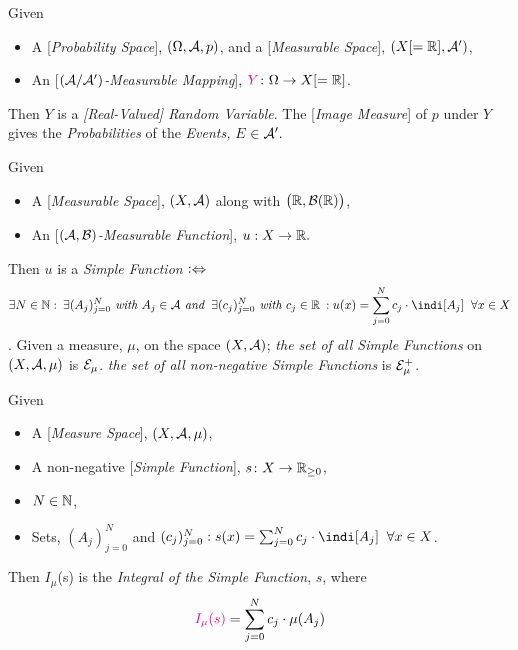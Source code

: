 \begin{definition}\label{def:rvariable}
Given 
\begin{itemize}
\item
A [\emph{Probability Space}], $(\Omega, \mathcal{A}, p)$, and a [\emph{Measurable Space}], $(X[=\mathbb{R}], \mathcal{A}')$,
\item
An [\emph{$(\mathcal{A}/\mathcal{A}')$-Measurable Mapping}], ${\color{Magenta}Y}\colon\Omega \rightarrow X[= \R]$.
\end{itemize}
Then {\color{Magenta}$Y$} is a {\color{Magenta} \emph{[Real-Valued] Random Variable}}.  The [\emph{Image Measure}] of $p$ under $Y$ gives the {\color{Magenta}\emph{Probabilities}} of the {\color{Magenta}\emph{Events,} $E$} $\in \mathcal{A}'.$ 
\end{definition}

\begin{definition}\label{def:sfun}
Given
\begin{itemize}
\item
	A [\emph{Measurable Space}], $(X, \mathcal{A})$ along with $\bigl(\mathbb{R}, \mathcal{B}(\mathbb{R})\bigr)$,
\item
	An [\emph{$(\mathcal{A}, \mathcal{B})$-Measurable Function}], $u: X \rightarrow \mathbb{R}.$
\end{itemize}
Then $u$ is a {\color{Magenta}\emph{Simple Function}} $\mathrel{\vcentcolon\Leftrightarrow}$
$$\exists N \in \N: \> \exists(A_j)_{j=0}^N \text{\it\ with } A_j \in \A \text{\it\ and } \> \exists(c_j)_{j=0}^N \text{\it\ with } %
c_j \in \R \> : u(x) = \sum_{j=0}^N c_j \cdot \indi[A_j] \;\; \forall x \in X$$.
Given a measure, $\mu$, on the space $(X, \mathcal{A})$; {\color{Magenta}\emph{the set of all Simple Functions}} on $(X, \mathcal{A}, \mu)$ is {\color{Magenta}\emph{$\mathcal{E}_\mu$}}. {\color{Magenta}\emph{the set of all non-negative Simple Functions}} is {\color{Magenta}\emph{$\mathcal{E}_\mu^+$}}.
\end{definition}

\begin{definition}\label{def:sint}
Given
\begin{itemize}
\item
	A [\emph{Measure Space}], $(X, \mathcal{A}, \mu)$,
\item
	A non-negative [\emph{Simple Function}], $s\colon X \rightarrow \mathbb{R}_{\geq 0}$,
\item
	$N \in \mathbb{N}$,
\item
	Sets, $(A_j)_{j=0}^N$ and $(c_j)_{j=0}^N : s(x) = \sum_{j=0}^N c_j \cdot \indi[A_j] \;\; \forall x \in X$.
\end{itemize}
Then {\color{Magenta}$I_\mu$(s)} is the {\color{Magenta}\emph{Integral of the Simple Function}}, $s$, where
$${\color{Magenta}I_\mu(s)} = \sum_{j=0}^N c_j \cdot \mu(A_j)$$
\end{definition}